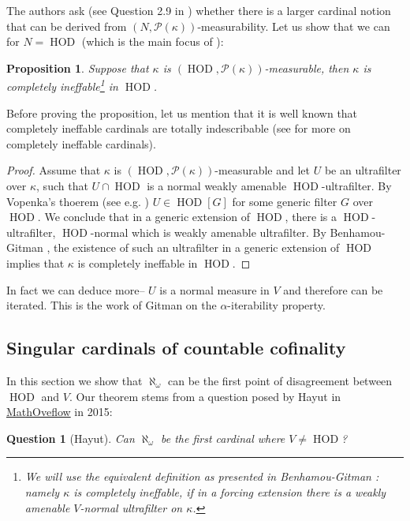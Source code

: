 \documentclass[11pt]{amsart}
\newtheorem{proposition}[theorem]{Proposition}
\theoremstyle{definition}
\newtheorem{question}[theorem]{Question}
\theoremstyle{remark}
\DeclareMathOperator{\HOD}{HOD}
\begin{document}
\smallskip

The authors ask (see Question 2.9 in \cite{APTER2021102901}) whether there is a larger cardinal notion that can be derived from $(N,\mathcal{P}(\kappa))$-measurability. Let us show that we can for $N=\HOD$ (which is the main focus of \cite{APTER2021102901}): 
\begin{proposition}
    Suppose that $\kappa$ is $(\HOD,\mathcal{P}(\kappa))$-measurable, then $\kappa$ is completely ineffable\footnote{We will use the equivalent definition as presented in Benhamou-Gitman \cite[Cor. 5.7]{Benhamou_Gitman}: namely $\kappa$ is completely ineffable, if in a forcing extension there is a weakly amenable $V$-normal ultrafilter on $\kappa$.} in $\HOD$.
\end{proposition}
Before proving the proposition, let us mention that it is well known that completely ineffable cardinals are totally indescribable (see \cite{AbramsonHarringtonKleinbergZwicker:FlippingProperties} for more on completely ineffable cardinals).

\begin{proof}
   Assume that $\kappa$ is $(\HOD,\mathcal{P}(\kappa))$-measurable and let $U$ be an ultrafilter over $\kappa$, such that $U\cap\HOD$ is a normal weakly amenable $\HOD$-ultrafilter. By Vopenka's thoerem (see e.g. \cite[Theorem 6]{WoodinDavisRodriguez}) $U\in \HOD[G]$ for some generic filter $G$ over $\HOD$. 
We conclude that in a generic extension of $\HOD$, there is a $\HOD$-ultrafilter, $\HOD$-normal which is weakly amenable ultrafilter. By Benhamou-Gitman \cite[Cor. 5.7]{Benhamou_Gitman}, the existence of such an ultrafilter in a generic extension of $\HOD$ implies that $\kappa$ is completely ineffable in $\HOD$. 
\end{proof}
In fact we can deduce more--  $U$ is a normal measure in $V$ and therefore can be iterated. This is the work of Gitman \cite{gitman:ramsey} on the $\alpha$-iterability property.

\subsection{Singular cardinals of countable cofinality}
In this section we show that 
$\aleph_\omega$ can be the first point of disagreement between $\HOD$ and $V$. Our theorem stems from a question posed by Hayut in \href{https://mathoverflow.net/questions/201555/can-the-first-ordinal-in-which-v-neq-hod-be-aleph-omega}{MathOveflow} in 2015: 
\begin{question}[Hayut]
  \emph{Can $\aleph_\omega$ be the first cardinal where $V\neq \HOD$?}  
\end{question}
\end{document}
